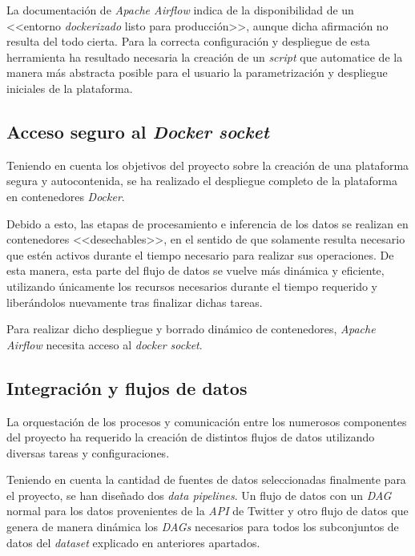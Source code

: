 La documentación de \textit{Apache Airflow} indica de la disponibilidad de un <<entorno \textit{dockerizado} listo para producción>>, aunque dicha afirmación no resulta del todo cierta. Para la correcta configuración y despliegue de esta herramienta ha resultado necesaria la creación de un \textit{script} que automatice de la manera más abstracta posible para el usuario la parametrización y despliegue iniciales de la plataforma.

\subsection{Acceso seguro al \textit{Docker socket}}

Teniendo en cuenta los objetivos del proyecto sobre la creación de una plataforma segura y autocontenida, se ha realizado el despliegue completo de la plataforma en contenedores \textit{Docker}.

Debido a esto, las etapas de procesamiento e inferencia de los datos se realizan en contenedores <<desechables>>, en el sentido de que solamente resulta necesario que estén activos durante el tiempo necesario para realizar sus operaciones. De esta manera, esta parte del flujo de datos se vuelve más dinámica y eficiente, utilizando únicamente los recursos necesarios durante el tiempo requerido y liberándolos nuevamente tras finalizar dichas tareas.

Para realizar dicho despliegue y borrado dinámico de contenedores, \textit{Apache Airflow} necesita acceso al \textit{docker socket}.

\subsection{Integración y flujos de datos}

La orquestación de los procesos y comunicación entre los numerosos componentes del proyecto ha requerido la creación de distintos flujos de datos utilizando diversas tareas y configuraciones.

Teniendo en cuenta la cantidad de fuentes de datos seleccionadas finalmente para el proyecto, se han diseñado dos \textit{data pipelines}. Un flujo de datos con un \textit{DAG} normal para los datos provenientes de la \textit{API} de Twitter y otro flujo de datos que genera de manera dinámica los \textit{DAGs} necesarios para todos los subconjuntos de datos del \textit{dataset} explicado en anteriores apartados.  
